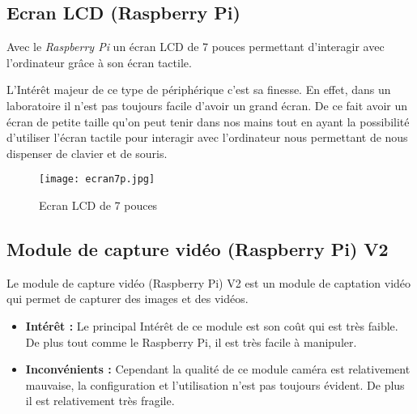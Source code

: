  
        \subsection{Ecran LCD (Raspberry Pi)}
        Avec le \textit{Raspberry Pi} un écran LCD de 7 pouces permettant d'interagir avec l'ordinateur grâce à son écran tactile. 

        \vspace{0.2cm}

        L'Intérêt majeur de ce type de périphérique c'est sa finesse.
        En effet, dans un laboratoire il n’est pas toujours facile d'avoir un grand écran.
        De ce fait avoir un écran de petite taille qu'on peut tenir dans nos mains tout en ayant la possibilité d'utiliser l'écran tactile pour interagir avec l'ordinateur nous permettant de nous dispenser de clavier et de souris.

        \begin{figure}[ht]
            \centering
            \texttt{[image: ecran7p.jpg]} 
            \caption{Ecran LCD de 7 pouces}
        \end{figure}

        \vspace{1cm}

        \subsection{Module de capture vidéo (Raspberry Pi) V2}
        Le module de capture vidéo (Raspberry Pi) V2 est un module de captation vidéo qui permet de capturer des images et des vidéos.


        \begin{flushleft}
            \begin{itemize}
                \item \textbf{Intérêt :}
                Le principal Intérêt de ce module est son coût qui est très faible. De plus tout comme le Raspberry Pi, il est très facile à manipuler. 
                \item \textbf{Inconvénients :}
                Cependant la qualité de ce module caméra est relativement mauvaise, la configuration et l’utilisation n’est pas toujours évident.
                De plus il est relativement très fragile.
            \end{itemize}                
        \end{flushleft}

